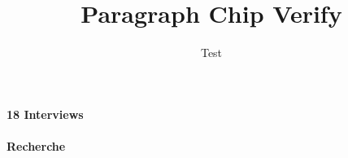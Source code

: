 \documentclass[type=zwischenbericht,theme=dark]{zukunftbau}
\title{Paragraph Chip Verify}
\author{Test}
\begin{document}
\setcounter{paragraph}{17}
\paragraph{18 Interviews}
\paragraph{Recherche}
\end{document}
